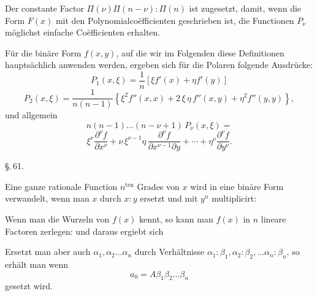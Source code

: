 
Der constante Factor $\Pi(\nu)\Pi(n-\nu):\Pi(n)$ ist zugesetzt,
damit, wenn die Form $F(x)$ mit den Polynomialcoëfficienten
geschrieben ist, die Functionen $P_\nu$ möglichst einfache Coëfficienten
erhalten.

Für die binäre Form $f(x,y)$, auf die wir im Folgenden
diese Definitionen hauptsächlich anwenden werden, ergeben sich
für die Polaren folgende Ausdrücke:
\[
P_1(x,\xi) = \frac{1}{n}\left[\xi f'(x) + \eta f'(y)\right]
\]
\[
P_2(x,\xi) = \frac{1}{n(n-1)}\left\{\xi^2 f''(x,x) + 2\,\xi\,\eta\, f''(x,y) + \eta^2 f''(y,y)\right\},
\]
und allgemein
\[
n(n-1)\ldots(n-\nu+1)\,P_\nu(x,\xi) =
\]
\[
\xi^\nu\frac{\partial^\nu f}{\partial x^\nu} + \nu\,\xi^{\nu-1}\eta\,\frac{\partial^\nu f}{\partial x^{\nu-1}\partial y} + \cdots + \eta^\nu\frac{\partial^\nu f}{\partial y^\nu}.
\]

\begin{center}
\S.\,61.

\end{center}

Eine ganze rationale Function $n^{\mathrm{ten}}$ Grades von $x$
wird in eine binäre Form verwandelt, wenn man $x$ durch $x:y$
ersetzt und mit $y^n$ multiplicirt:

Wenn man die Wurzeln von $f(x)$ kennt, so kann man $f(x)$
in $n$ lineare Factoren zerlegen:
und daraus ergiebt sich

Ersetzt man aber auch $\alpha_1, \alpha_2\ldots\alpha_n$ durch
Verhältnisse $\alpha_1:\beta_1, \alpha_2:\beta_2, \ldots \alpha_n:\beta_n$, so
erhält man
wenn
\[
a_0 = A\beta_1\beta_2\ldots\beta_n
\]
gesetzt wird.
